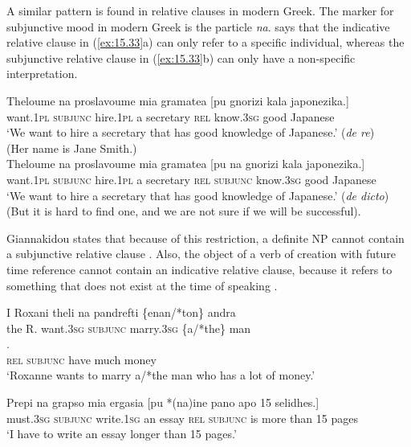 A similar pattern is found in relative clauses in modern Greek. The marker for subjunctive mood in modern Greek is the particle \textit{na}. \citet{Giannakidou2011} says that the indicative relative clause in (\ref{ex:15.33}a) can only refer to a specific individual, whereas the subjunctive relative clause in (\ref{ex:15.33}b) can only have a non-specific interpretation.


\ea \label{ex:15.33}
\ea  \gll Theloume  na  proslavoume  mia  gramatea  [pu  gnorizi  kala  japonezika.]\\
want.\textsc{1pl} \textsc{subjunc}  hire.\textsc{1pl} a  secretary  \textsc{rel}  know.\textsc{3sg} good  Japanese\\
\glt ‘We want to hire a secretary that has good knowledge of Japanese.’  (\textit{de re})\\
(Her name is Jane Smith.)\\
\ex \gll  Theloume  na  proslavoume  mia  gramatea [pu  na  gnorizi  kala  japonezika.]\\
want.\textsc{1pl} \textsc{subjunc}  hire.\textsc{1pl} a  secretary \textsc{rel}  \textsc{subjunc}  know.\textsc{3sg} good  Japanese\\
\glt ‘We want to hire a secretary that has good knowledge of Japanese.’  (\textit{de dicto})\\
(But it is hard to find one, and we are not sure if we will be successful).\\
\z \z


Giannakidou states that because of this restriction, a definite NP cannot contain a subjunctive relative clause . Also, the object of a verb of creation with future time reference cannot contain an indicative relative clause, because it refers to something that does not exist at the time of speaking .


\ea \label{ex:15.34} 
\ea  \gll I  Roxani  theli  na  pandrefti  \{enan/*ton\}  andra\\
the  R.  want.\textsc{3sg} \textsc{subjunc}  marry.\textsc{3sg} \{a/*the\}  man\\
\ex \gll{}.\\
 \textsc{rel}  \textsc{subjunc}  have  much  money\\
\glt ‘Roxanne wants to marry a/*the man who has a lot of money.’\\
\z \z

\ea \label{ex:15.35}
\gll Prepi  na  grapso  mia  ergasia  [pu  *(na)\footnotemark  ine  pano  apo  15  selidhes.]\\
must.\textsc{3sg} \textsc{subjunc}  write.\textsc{1sg} an  essay  \textsc{rel}  \textsc{subjunc}  is  more  than  15  pages\\
\glt ‘I have to write an essay longer than 15 pages.’\\
\z
{}

